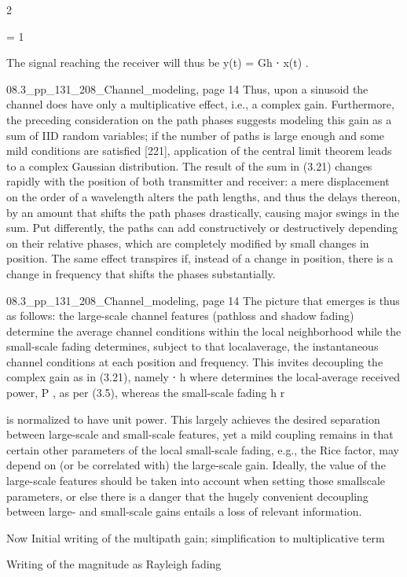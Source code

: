 {{{{2

= 1

The signal reaching the receiver will thus be y(t) = \sqrt Gh ⋅ x(t) .

08.3_pp_131_208_Channel_modeling, page 14 Thus, upon a sinusoid the channel does have only a multiplicative effect, i.e., a complex gain. Furthermore, the preceding consideration on the path phases suggests modeling this gain as a sum of IID random variables; if the number of paths is large enough and some mild conditions are satisfied [221], application of the central limit theorem leads to a complex Gaussian distribution. The result of the sum in (3.21)
changes rapidly with the position of both transmitter and receiver: a mere displacement on the order of a wavelength alters the path lengths, and thus the delays thereon, by an amount that shifts the path phases drastically, causing major swings in the sum. Put differently, the paths can add constructively or destructively depending on their relative phases, which are completely modified by small changes in position. The same effect transpires if, instead of a change in position, there is a change in frequency that shifts the phases substantially.

08.3_pp_131_208_Channel_modeling, page 14 The picture that emerges is thus as follows: the large-scale channel features
(pathloss and shadow fading) determine the average channel conditions within the local neighborhood while the small-scale fading determines, subject to that localaverage, the instantaneous channel conditions at each position and frequency. This invites decoupling the complex gain as in (3.21), namely \sqrtG ⋅ h where \sqrtG determines the local-average received power, P , as per (3.5), whereas the small-scale fading h r

is normalized to have unit power. This largely achieves the desired separation between large-scale and small-scale features, yet a mild coupling remains in that certain other parameters of the local small-scale fading, e.g., the Rice factor, may depend on (or be correlated with) the large-scale gain. Ideally, the value of the large-scale features should be taken into account when setting those smallscale parameters, or else there is a danger that the hugely convenient decoupling between large- and small-scale gains entails a loss of relevant information.

Now Initial writing of the multipath gain;
simplification to multiplicative term

Writing of the magnitude as Rayleigh fading

}}}}
